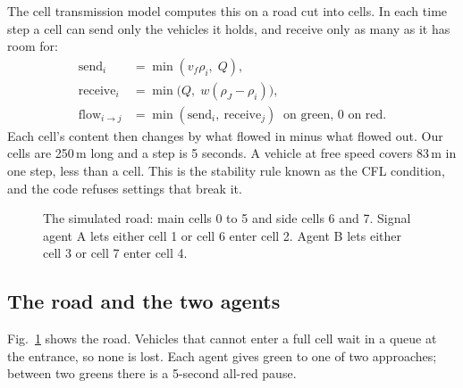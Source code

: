 \documentclass[conference]{IEEEtran}
\begin{document}
The cell transmission model \cite{ctm,ctmoverview} computes this on a road cut into cells. In each time step a cell can send only the vehicles it holds, and receive only as many as it has room for:
\begin{align}
\text{send}_i&=\min(v_f\rho_i,\;Q),\\
\text{receive}_i&=\min\bigl(Q,\;w(\rho_J-\rho_i)\bigr),\\
\text{flow}_{i\to j}&=\min(\text{send}_i,\ \text{receive}_j)\ \text{ on green, } 0\text{ on red}.
\end{align}
Each cell's content then changes by what flowed in minus what flowed out. Our cells are 250\,m long and a step is 5 seconds. A vehicle at free speed covers 83\,m in one step, less than a cell. This is the stability rule known as the CFL condition, and the code refuses settings that break it.

\begin{figure}[t]\centering
{}
\caption{The simulated road: main cells 0 to 5 and side cells 6 and 7. Signal agent A lets either cell 1 or cell 6 enter cell 2. Agent B lets either cell 3 or cell 7 enter cell 4.}\label{fig:corridor}
\end{figure}

\subsection{The road and the two agents}
Fig.~\ref{fig:corridor} shows the road. Vehicles that cannot enter a full cell wait in a queue at the entrance, so none is lost. Each agent gives green to one of two approaches; between two greens there is a 5-second all-red pause.
\end{document}
